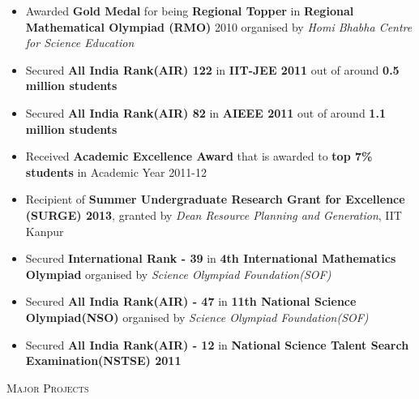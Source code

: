 \documentclass[9pt]{article}
\newenvironment{changemargin}[2]{%
  \begin{list}{}{%
    \setlength{\topsep}{0pt}%
    \setlength{\leftmargin}{#1}%
    \setlength{\rightmargin}{#2}%
    \setlength{\listparindent}{\parindent}%
    \setlength{\itemindent}{\parindent}%
    \setlength{\parsep}{\parskip}%
  }%
  \item[]}{\end{list}
}
\newcommand{\lineover}{
	\begin{changemargin}{-0.05in}{-0.10in}
		\vspace*{-8pt}
		\hrulefill \\
		\vspace*{-2pt}
	\end{changemargin}
}
\newcommand{\header}[1]{
	\begin{changemargin}{-0.75in}{-0.75in}
		\scshape{#1}\\
  	\lineover
	\end{changemargin}
}
\newenvironment{body} {
	\vspace*{-16pt}
	\begin{changemargin}{-0.6in}{-0.65in}
  }	
	{\end{changemargin}
}
\begin{document}
\begin{body}
	\vspace{14pt}
	\begin{itemize}
	\item{Awarded \textbf{Gold Medal} for being \textbf{Regional Topper} in \textbf{Regional Mathematical Olympiad (RMO)} 2010 organised by \emph{Homi Bhabha Centre for Science Education}}
	\item{Secured \textbf{All India Rank(AIR) 122} in \textbf{IIT-JEE 2011} out of around \textbf{0.5 million students}}
	\item{Secured \textbf{All India Rank(AIR) 82} in \textbf{AIEEE 2011} out of around \textbf{1.1 million students}}
	\item{Received \textbf{Academic Excellence Award} that is awarded to \textbf{top 7\% students} in Academic Year 2011-12}
	\item{Recipient of \textbf{Summer Undergraduate Research Grant for Excellence (SURGE) 2013}, granted by \emph{Dean Resource Planning and Generation}, IIT Kanpur}
	\item{Secured \textbf{International Rank - 39} in \textbf{4th International Mathematics Olympiad} organised by \emph{Science Olympiad Foundation(SOF)}}
	\item{Secured \textbf{All India Rank(AIR) - 47} in \textbf{11th National Science Olympiad(NSO)} organised by \emph{Science Olympiad Foundation(SOF)}}
	\item{Secured \textbf{All India Rank(AIR) - 12} in \textbf{National Science Talent Search Examination(NSTSE) 2011}}
	\end{itemize}
\end{body}

\header{Major Projects}
\end{document}
